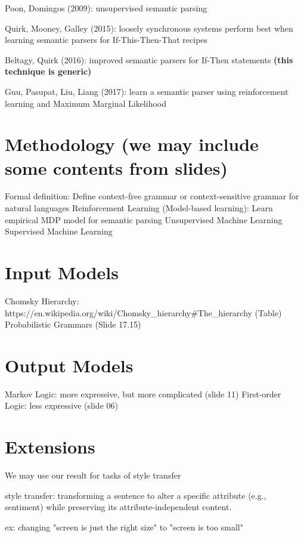 \documentclass[5pt]{article}
\begin{document}
	Poon, Domingos (2009): unsupervised semantic parsing

	Quirk, Mooney, Galley (2015): loosely synchronous systems perform best when learning semantic parsers for If-This-Then-That recipes

	Beltagy, Quirk (2016): improved semantic parsers for If-Then statements \textbf{(this technique is generic)}

	Guu, Pasupat, Liu, Liang (2017): learn a semantic parser using reinforcement learning and Maximum Marginal Likelihood

\section{Methodology (we may include some contents from slides)}
	Formal definition: Define context-free grammar or context-sensitive grammar for natural languages
	Reinforcement Learning (Model-based learning): Learn empirical MDP model for semantic parsing
	Unsupervised Machine Learning
	Supervised Machine Learning

\section{Input Models} 
	Chomsky Hierarchy: 
	https://en.wikipedia.org/wiki/Chomsky_hierarchy#The_hierarchy (Table)
	Probabilistic Grammars (Slide 17.15)

\section{Output Models}
	Markov Logic: more expressive, but more complicated (slide 11)
	First-order Logic: less expressive (slide 06)

\section{Extensions}
	We may use our result for tasks of style transfer 

	style transfer: transforming a sentence to alter a specific attribute (e.g., sentiment) while preserving its attribute-independent content. 

	ex: changing "screen is just the right size" to "screen is too small"
\end{document}
